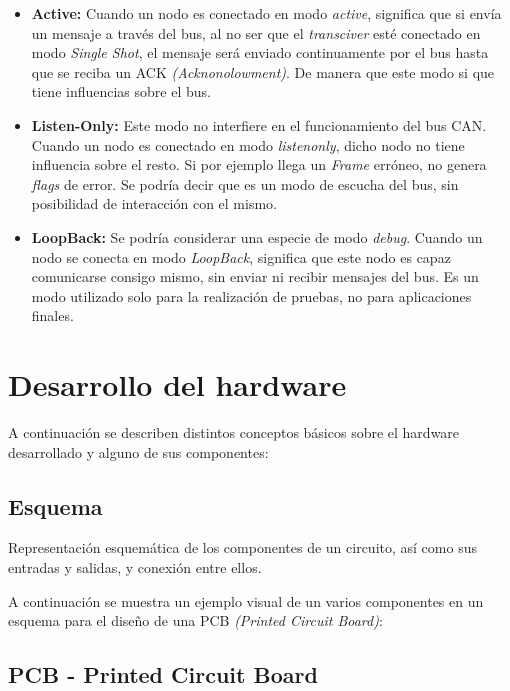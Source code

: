 \begin{itemize}
\item
\textbf{Active:} Cuando un nodo es conectado en modo \emph{active}, significa que si envía un mensaje a través del bus, al no ser que el \emph{transciver} esté conectado en modo \emph{Single Shot}, el mensaje será enviado continuamente por el bus hasta que se reciba un ACK \emph{(Acknonolowment)}. De manera que este modo si que tiene influencias sobre el bus.

\item
\textbf{Listen-Only:} Este modo no interfiere en el funcionamiento del bus CAN. Cuando un nodo es conectado en modo \emph{listenonly}, dicho nodo no tiene influencia sobre el resto. Si por ejemplo llega un \emph{Frame} erróneo, no genera \emph{flags} de error. Se podría decir que es un modo de escucha del bus, sin posibilidad de interacción con el mismo.

\item
\textbf{LoopBack:} Se podría considerar una especie de modo \emph{debug}. Cuando un nodo se conecta en modo \emph{LoopBack}, significa que este nodo es capaz comunicarse consigo mismo, sin enviar ni recibir mensajes del bus. Es un modo utilizado solo para la realización de pruebas, no para aplicaciones finales.

\end{itemize}


\section{Desarrollo del hardware}\label{desarrollo_del_hardware}

A continuación se describen distintos conceptos básicos sobre el hardware desarrollado y alguno de sus componentes:

\subsection{Esquema}\label{esquema}

Representación esquemática de los componentes de un circuito, así como sus entradas y salidas, y conexión entre ellos.

A continuación se muestra un ejemplo visual de un varios componentes en un esquema para el diseño de una PCB \emph{(Printed Circuit Board)}:


\subsection{PCB - Printed Circuit Board}\label{pcb_printed_circuit_board}


